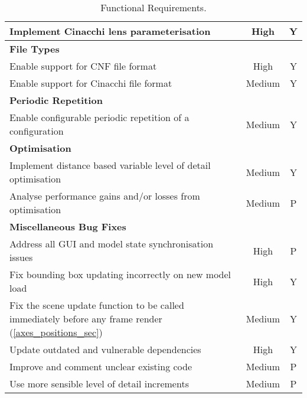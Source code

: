 \begin{table}
\begin{center}
\begin{adjustbox}{width=\textwidth}
\begin{tabular}{lcc}
       Implement Cinacchi lens parameterisation & High & Y\\
       \hline
        \textbf{File Types} & &\\
       \hline
       Enable support for CNF file format & High & Y\\
       Enable support for Cinacchi file format & Medium & Y\\
        \hline
       \textbf{Periodic Repetition} & &\\
       \hline
       Enable configurable periodic repetition of a configuration & Medium & Y\\
        \hline
       \textbf{Optimisation} & &\\
       \hline
       Implement distance based variable level of detail optimisation & Medium & Y\\
        Analyse performance gains and/or losses from optimisation & Medium & P\\
      \hline
       \textbf{Miscellaneous Bug Fixes} & &\\
       \hline
       Address all GUI and model state synchronisation issues & High & P\\
       Fix bounding box updating incorrectly on new model load & High & Y\\
       Fix the scene update function to be called immediately before any frame render (\cref{axes_positions_sec}) & Medium & Y\\
       Update outdated and vulnerable dependencies & High & Y\\
       Improve and comment unclear existing code & Medium & P\\
       Use more sensible level of detail increments & Medium & P\\
       \hline\hline
    \end{tabular}
  \end{adjustbox}
  \end{center}
  \caption{Functional Requirements.}
  \label{tab:func}
\end{table}

